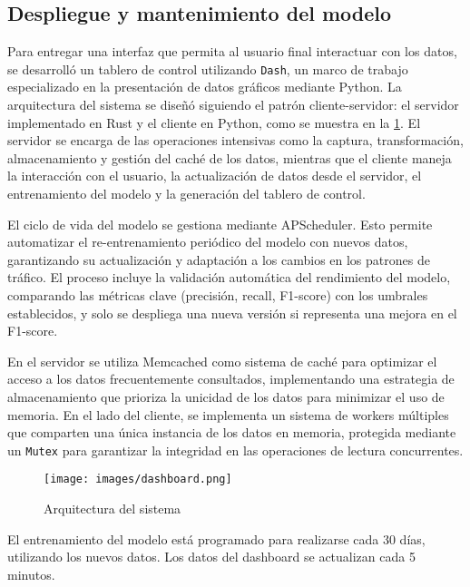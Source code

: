 \documentclass[12pt]{article}
\begin{document}
{%

\subsection{Despliegue y mantenimiento del modelo}

Para entregar una interfaz que permita al usuario final interactuar con los datos, se desarrolló un tablero de control utilizando \texttt{Dash}, un marco de trabajo especializado en la presentación de datos gráficos mediante Python. La arquitectura del sistema se diseñó siguiendo el patrón cliente-servidor: el servidor implementado en Rust y el cliente en Python, como se muestra en la \cref{fig:architecture}. El servidor se encarga de las operaciones intensivas como la captura, transformación, almacenamiento y gestión del caché de los datos, mientras que el cliente maneja la interacción con el usuario, la actualización de datos desde el servidor, el entrenamiento del modelo y la generación del tablero de control.

El ciclo de vida del modelo se gestiona mediante APScheduler. Esto permite automatizar el re-entrenamiento periódico del modelo con nuevos datos, garantizando su actualización y adaptación a los cambios en los patrones de tráfico. El proceso incluye la validación automática del rendimiento del modelo, comparando las métricas clave (precisión, recall, F1-score) con los umbrales establecidos, y solo se despliega una nueva versión si representa una mejora en el F1-score.

En el servidor se utiliza Memcached como sistema de caché para optimizar el acceso a los datos frecuentemente consultados, implementando una estrategia de almacenamiento que prioriza la unicidad de los datos para minimizar el uso de memoria. En el lado del cliente, se implementa un sistema de workers múltiples que comparten una única instancia de los datos en memoria, protegida mediante un \texttt{Mutex} para garantizar la integridad en las operaciones de lectura concurrentes.

\begin{figure}[H]
    \centering
    \texttt{[image: images/dashboard.png]}
    \caption{Arquitectura del sistema}
    \label{fig:architecture}
\end{figure}

El entrenamiento del modelo está programado para realizarse cada 30 días, utilizando los nuevos datos. Los datos del dashboard se actualizan cada 5 minutos.


}
\end{document}
